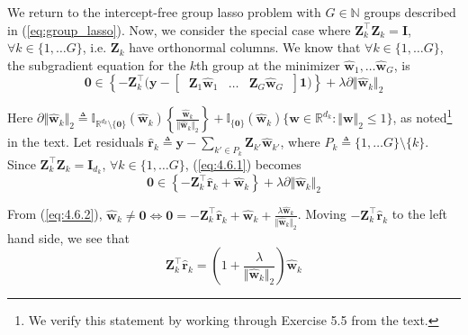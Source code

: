 \documentclass{article}
\numberwithin{equation}{section}
\begin{document}
 \label{sec:4.6}

We return to the intercept-free group lasso problem with $ G \in \mathbb{N} $
groups described in (\ref{eq:group_lasso}). Now, we consider the special case
where $ \mathbf{Z}_k^\top\mathbf{Z}_k = \mathbf{I} $,
$ \forall k \in \{1, \ldots G\} $, i.e. $ \mathbf{Z}_k $ have orthonormal
columns. We know that $ \forall k \in \{1, \ldots G\} $, the subgradient
equation for the $ k $th group at the minimizer
$ \hat{\mathbf{w}}_1, \ldots \hat{\mathbf{w}}_G $, is
\begin{equation} \label{eq:4.6.1}
    \mathbf{0} \in
    \left\{
        -\mathbf{Z}_k^\top
        \big(
            \mathbf{y} -
            \begin{bmatrix}
                \ \mathbf{Z}_1\hat{\mathbf{w}}_1 &
                \ldots &
                \mathbf{Z}_G\hat{\mathbf{w}}_G \
            \end{bmatrix}
            \mathbf{1}
        \big)
    \right\} +
    \lambda\partial\Vert\hat{\mathbf{w}}_k\Vert_2
\end{equation}

Here $ \partial\Vert\hat{\mathbf{w}}_k\Vert_2 \triangleq
\mathbb{I}_{\mathbb{R}^{d_k} \setminus \{\mathbf{0}\}}(\hat{\mathbf{w}}_k)
\left\{\frac{\hat{\mathbf{w}}_k}{\Vert\hat{\mathbf{w}}_k\Vert_2}\right\} +
\mathbb{I}_{\{\mathbf{0}\}}(\hat{\mathbf{w}}_k)
\{\mathbf{w} \in \mathbb{R}^{d_k} : \Vert\mathbf{w}\Vert_2 \le 1\} $, as
noted\footnote{
    We verify this statement by working through Exercise 5.5 from the text.
} in the text. Let residuals $ \hat{\mathbf{r}}_k \triangleq \mathbf{y} -
\sum_{k' \in P_k}\mathbf{Z}_{k'}\hat{\mathbf{w}}_{k'} $, where
$ P_k \triangleq \{1, \ldots G\} \setminus \{k\} $. Since
$ \mathbf{Z}_k^\top\mathbf{Z}_k = \mathbf{I}_{d_k} $,
$ \forall k \in \{1, \ldots G\} $, (\ref{eq:4.6.1}) becomes
\begin{equation} \label{eq:4.6.2}
    \mathbf{0} \in
    \left\{
        -\mathbf{Z}_k^\top\hat{\mathbf{r}}_k + \hat{\mathbf{w}}_k
    \right\} +
    \lambda\partial\Vert\hat{\mathbf{w}}_k\Vert_2
\end{equation}

From (\ref{eq:4.6.2}), $ \hat{\mathbf{w}}_k \ne \mathbf{0} \Leftrightarrow
\mathbf{0} = -\mathbf{Z}_k^\top\hat{\mathbf{r}}_k + \hat{\mathbf{w}}_k +
\frac{\lambda\hat{\mathbf{w}}_k}{\Vert\hat{\mathbf{w}}_k\Vert_2} $. Moving
$ -\mathbf{Z}_k^\top\hat{\mathbf{r}}_k $ to the left hand side, we see that
\begin{equation} \label{eq:4.6.3}
    \mathbf{Z}_k^\top\hat{\mathbf{r}}_k =
    \left(1 + \frac{\lambda}{\Vert\hat{\mathbf{w}}_k\Vert_2}\right)
    \hat{\mathbf{w}}_k
\end{equation}
\end{document}
